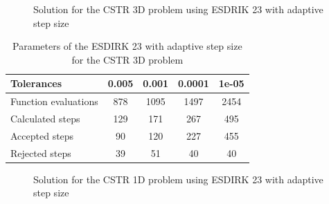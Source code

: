 \begin{figure}[H]
    \centering
    \caption{Solution for the CSTR 3D problem using ESDRIK 23 with adaptive step size}
    \label{8_5_3D_tols}
\end{figure}

\begin{table}[H]
    \centering
    \begin{tabular}{@{}l|cccc@{}}
    \toprule
    Tolerances           & 0.005 & 0.001 & 0.0001 & 1e-05 \\ \midrule
    Function evaluations & 878   & 1095  & 1497   & 2454  \\
    Calculated steps     & 129   & 171   & 267    & 495   \\
    Accepted steps       & 90    & 120   & 227    & 455   \\
    Rejected steps       & 39    & 51    & 40     & 40    \\ \bottomrule
    \end{tabular}
    \caption{Parameters of the ESDIRK 23 with adaptive step size for the CSTR 3D problem}
    \label{8_5_3D_tols_table}
\end{table}

\begin{figure}[H]
    \centering
    \caption{Solution for the CSTR 1D problem using ESDIRK 23 with adaptive step size}
    \label{8_5_1D_tols}
\end{figure}

